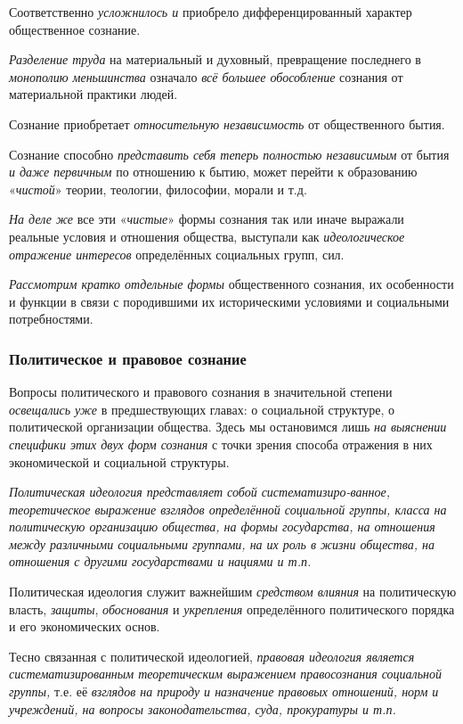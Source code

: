 \documentclass[a4paper,14pt,russian]{extreport}
\begin{document}
Соответственно \emph{усложнилось и} приобрело дифференцированный характер общественное сознание.

\emph{Разделение труда} на материальный и духовный, превращение последнего в \emph{монополию меньшинства} означало \emph{всё большее обособление} сознания от материальной практики людей.

Сознание приобретает \emph{относительную независимость} от общественного бытия.

Сознание способно \emph{представить себя теперь полностью независимым} от бытия \emph{и даже первичным} по отношению к бытию, может перейти к образованию «\emph{чистой}» теории, теологии, философии, морали и т.д.

\emph{На деле же} все эти «\emph{чистые}» формы сознания так или иначе выражали реальные условия и отношения общества, выступали как \emph{идеологическое отражение интересов} определённых социальных групп, сил.

\emph{Рассмотрим кратко отдельные формы} общественного сознания, их особенности и функции в связи с породившими их историческими условиями и социальными потребностями.

\subsubsection{Политическое и правовое сознание}

Вопросы политического и правового сознания в значительной степени \emph{освещались уже} в предшествующих главах: о социальной структуре, о политической организации общества. Здесь мы остановимся лишь \emph{на выяснении специфики этих двух форм сознания} с точки зрения способа отражения в них экономической и социальной структуры.

\emph{Политическая идеология представляет собой систематизиро-ванное, теоретическое выражение взглядов определённой социальной группы, класса на политическую организацию общества, на формы государства, на отношения между различными социальными группами, на их роль в жизни общества, на отношения с другими государствами и нациями и т.п.}

Политическая идеология служит важнейшим \emph{средством влияния} на политическую власть, \emph{защиты}, \emph{обоснования} и \emph{укрепления} определённого политического порядка и его экономических основ.

Тесно связанная с политической идеологией, \emph{правовая идеология является систематизированным теоретическим выражением правосознания социальной группы,} т.е. её \emph{взглядов на природу и назначение правовых отношений, норм и учреждений, на вопросы законодательства, суда, прокуратуры и т.п.}
\end{document}
